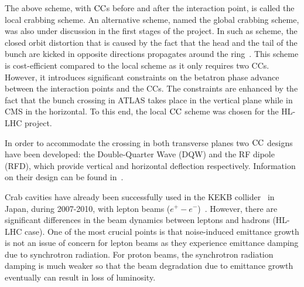 The above scheme, with ${\mathrm{CC}}$s before and after the interaction point, is called the local crabbing scheme. An alternative scheme, named the global crabbing scheme, was also under discussion in the first stages of the project. In such as scheme, the closed orbit distortion that is caused by the fact that the head and the tail of the bunch are kicked in opposite directions propagates around the ring~\cite{Brning2015}.%
 This scheme is cost-efficient compared to the local scheme as it only requires two CCs. However, it introduces significant constraints on the betatron phase advance between the interaction points and the CCs. The constraints are enhanced by the fact that the bunch crossing in ATLAS takes place in the vertical plane while in CMS in the horizontal. To this end, the local ${\mathrm{CC}}$ scheme was chosen for the HL-LHC project. %

In order to accommodate the crossing in both transverse planes two ${\mathrm{CC}}$ designs have been developed: the Double-Quarter Wave (DQW) and the RF dipole (RFD), which provide vertical and horizontal deflection respectively. Information on their design can be found in~\cite{Zanoni:2288282, DeSilva:2288607, Xiao:1992565, Verdú-Andrés:2113440}.

Crab cavities have already been successfully used in the KEKB collider~\cite{Toge:475260} in Japan, during 2007-2010, with lepton beams ($e^{+} - e^{-}$)~\cite{CC_KEKB_4440798, Funakoshi:1955812, oide:pac07-mozaki01}. However, there are significant differences in the beam dynamics between leptons and hadrons (HL-LHC case). One of the most crucial points is that noise-induced emittance growth is not an issue of concern for lepton beams as they experience emittance damping due to synchrotron radiation. For proton beams, the synchrotron radiation damping is much weaker so that the beam degradation due to emittance growth eventually can result in loss of luminosity. %


